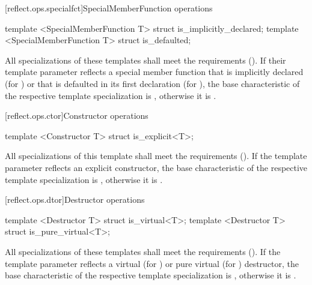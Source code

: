 [reflect.ops.specialfct]{SpecialMemberFunction operations}
\begin{std.txt}\color{addclr}
\begin{itemdecl}
template <SpecialMemberFunction T> struct is_implicitly_declared;
template <SpecialMemberFunction T> struct is_defaulted;
\end{itemdecl}
\begin{itemdescr}
\pnum
      All specializations of these templates shall meet the
       requirements (). If their template
      parameter reflects a special member function that is implicitly declared
      (for ) or that is defaulted in its first
      declaration (for ), the base characteristic of the
      respective template specialization is , otherwise it is
      .
\end{itemdescr}
\end{std.txt}

[reflect.ops.ctor]{Constructor operations}
\begin{std.txt}\color{addclr}
\begin{itemdecl}
template <Constructor T> struct is_explicit<T>;
\end{itemdecl}
\begin{itemdescr}
\pnum
      All specializations of this template shall meet the
       requirements (). If the template
      parameter reflects an explicit constructor, the base characteristic of
      the respective template specialization is , otherwise it
      is .
\end{itemdescr}
\end{std.txt}


[reflect.ops.dtor]{Destructor operations}
\begin{std.txt}\color{addclr}
\begin{itemdecl}
template <Destructor T> struct is_virtual<T>;
template <Destructor T> struct is_pure_virtual<T>;
\end{itemdecl}
\begin{itemdescr}
\pnum
      All specializations of these templates shall meet the
       requirements (). If the template
      parameter reflects a virtual (for ) or pure virtual
      (for ) destructor, the base characteristic of the
      respective template specialization is , otherwise it is
      .
\end{itemdescr}
\end{std.txt}


